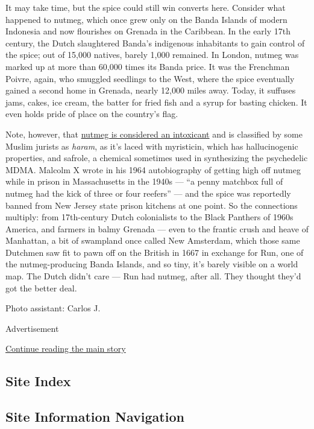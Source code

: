 It may take time, but the spice could still win converts here. Consider
what happened to nutmeg, which once grew only on the Banda Islands of
modern Indonesia and now flourishes on Grenada in the Caribbean. In the
early 17th century, the Dutch slaughtered Banda's indigenous inhabitants
to gain control of the spice; out of 15,000 natives, barely 1,000
remained. In London, nutmeg was marked up at more than 60,000 times its
Banda price. It was the Frenchman Poivre, again, who smuggled seedlings
to the West, where the spice eventually gained a second home in Grenada,
nearly 12,000 miles away. Today, it suffuses jams, cakes, ice cream, the
batter for fried fish and a syrup for basting chicken. It even holds
pride of place on the country's flag.

Note, however, that
\href{https://well.blogs.nytimes3xbfgragh.onion/2014/11/25/a-warning-on-nutmeg/}{nutmeg
is considered an intoxicant} and is classified by some Muslim jurists as
\emph{haram}, as it's laced with myristicin, which has hallucinogenic
properties, and safrole, a chemical sometimes used in synthesizing the
psychedelic MDMA. Malcolm X wrote in his 1964 autobiography of getting
high off nutmeg while in prison in Massachusetts in the 1940s --- ``a
penny matchbox full of nutmeg had the kick of three or four reefers''
--- and the spice was reportedly banned from New Jersey state prison
kitchens at one point. So the connections multiply: from 17th-century
Dutch colonialists to the Black Panthers of 1960s America, and farmers
in balmy Grenada --- even to the frantic crush and heave of Manhattan, a
bit of swampland once called New Amsterdam, which those same Dutchmen
saw fit to pawn off on the British in 1667 in exchange for Run, one of
the nutmeg-producing Banda Islands, and so tiny, it's barely visible on
a world map. The Dutch didn't care --- Run had nutmeg, after all. They
thought they'd got the better deal.

Photo assistant: Carlos J.

Advertisement

\protect\hyperlink{after-bottom}{Continue reading the main story}

\hypertarget{site-index}{%
\subsection{Site Index}\label{site-index}}

\hypertarget{site-information-navigation}{%
\subsection{Site Information
Navigation}\label{site-information-navigation}}

